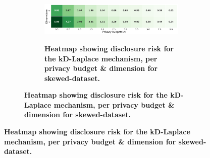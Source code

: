 \newpage
\begin{figure}
    \centering
    \begin{subfigure}[b]{0.85\textwidth}
        \begin{subfigure}[c]{1\textwidth}
            \caption{\textbf{Heatmap showing disclosure risk for the kD-Laplace mechanism, per privacy budget \& dimension for skewed-dataset.}}
            \includegraphics[width=1\textwidth]{Results/kd-laplace/kd-Laplace/skewed-dataset/distance.png}
            \label{fig:privacy-risk_skewed-dataset_adversial_advantage_kd-laplace}
        \end{subfigure}
        \vfill %


\end{subfigure}
\end{figure}
